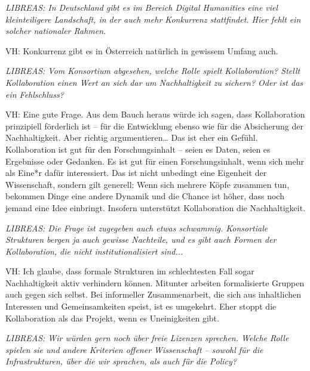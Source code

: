 \documentclass[a4paper,
fontsize=11pt,
oneside,
numbers=noperiodatend,
parskip=half-,
bibliography=totoc,
final
]{scrartcl}
\begin{document}
\emph{LIBREAS: In Deutschland gibt es im Bereich Digital Humanities eine
viel kleinteiligere Landschaft, in der auch mehr Konkurrenz stattfindet.
Hier fehlt ein solcher nationaler Rahmen.}

VH: Konkurrenz gibt es in Österreich natürlich in gewissem Umfang auch.

\emph{LIBREAS: Vom Konsortium abgesehen, welche Rolle spielt
Kollaboration? Stellt Kollaboration einen Wert an sich dar um
Nachhaltigkeit zu sichern? Oder ist das ein Fehlschluss?}

VH: Eine gute Frage. Aus dem Bauch heraus würde ich sagen, dass
Kollaboration prinzipiell förderlich ist -- für die Entwicklung ebenso
wie für die Absicherung der Nachhaltigkeit. Aber richtig
argumentieren\ldots{} Das ist eher ein Gefühl. Kollaboration ist gut für
den Forschungsinhalt -- seien es Daten, seien es Ergebnisse oder
Gedanken. Es ist gut für einen Forschungsinhalt, wenn sich mehr als
Eine*r dafür interessiert. Das ist nicht unbedingt eine Eigenheit der
Wissenschaft, sondern gilt generell: Wenn sich mehrere Köpfe zusammen
tun, bekommen Dinge eine andere Dynamik und die Chance ist höher, dass
noch jemand eine Idee einbringt. Insofern unterstützt Kollaboration die
Nachhaltigkeit.

\emph{LIBREAS: Die Frage ist zugegeben auch etwas schwammig. Konsortiale
Strukturen bergen ja auch gewisse Nachteile, und es gibt auch Formen der
Kollaboration, die nicht institutionalisiert sind...}

VH: Ich glaube, dass formale Strukturen im schlechtesten Fall sogar
Nachhaltigkeit aktiv verhindern können. Mitunter arbeiten formalisierte
Gruppen auch gegen sich selbst. Bei informeller Zusammenarbeit, die sich
aus inhaltlichen Interessen und Gemeinsamkeiten speist, ist es
umgekehrt. Eher stoppt die Kollaboration als das Projekt, wenn es
Uneinigkeiten gibt.

\emph{LIBREAS: Wir würden gern noch über freie Lizenzen sprechen. Welche
Rolle spielen sie und andere Kriterien offener Wissenschaft -- sowohl
für die Infrastrukturen, über die wir sprachen, als auch für die
Policy?}
\end{document}
